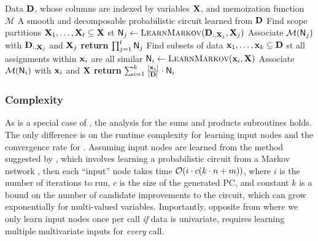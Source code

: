 \begin{algorithm}[t]
  \caption{}\label{alg:extendid}
  \begin{algorithmic}[1]
    \Require Data $\mathbf{D}$, whose columns are indexed by variables $\mathbf{X}$, and memoization
      function $\mathcal{M}$
    \Ensure A smooth and decomposable probabilistic circuit learned from $\mathbf{D}$
    \State Find scope partitions $\mathbf{X}_1,\ldots,\mathbf{X}_t\subseteq\mathbf{X}$ st
        \State $\Node_j\gets\textproc{LearnMarkov}(\set{D}_{:,\set{X}_j},\set{X}_j)$
        \State Associate $\mathcal{M}(\operatorname{\textup{\textsf{N}}}_j)$ with $\mathbf{D}_{:,\mathbf{X}_j}$ and $\mathbf{X}_j$
      \EndFor
      \State \textbf{return} $\prod_{j=1}^t \operatorname{\textup{\textsf{N}}}_j$
    \Else
      \State Find subsets of data $\mathbf{x}_1,\ldots,\mathbf{x}_k\subseteq\mathbf{D}$ st all assignments
        within $\mathbf{x}_i$ are all similar
        \State $\Node_i\gets\textproc{LearnMarkov}(\set{x}_i,\set{X})$
        \State Associate $\mathcal{M}(\operatorname{\textup{\textsf{N}}}_i)$ with $\mathbf{x}_i$ and $\mathbf{X}$
      \EndFor
      \State \textbf{return} $\sum_{i=1}^k \frac{|\mathbf{x}_i|}{|\mathbf{D}|}\cdot\operatorname{\textup{\textsf{N}}}_i$
    \EndIf
  \end{algorithmic}
\end{algorithm}

\subsubsection{Complexity}

As  is a special case of , the analysis for the sums and
products subroutines holds. The only difference is on the runtime complexity for learning input
nodes and the convergence rate for . Assuming input nodes are learned from the
method suggested by \citet{rooshenas14}, which involves learning a probabilistic circuit from a
Markov network \citep{lowd13a}, then each ``input'' node takes time $\mathcal{O}(i\cdot c(k\cdot n+m))$,
where $i$ is the number of iterations to run, $c$ is the size of the generated PC, and constant $k$
is a bound on the number of candidate improvements to the circuit, which can grow exponentially for
multi-valued variables. Importantly, opposite from  where we only learn input
nodes once per call \emph{if} data is univariate,  requires learning multiple
multivariate inputs for \emph{every}  call.

